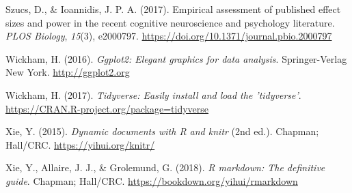 \documentclass[
  english,
  man,floatsintext]{apa6}
\newlength{\cslhangindent}
\newenvironment{cslreferences}%
  {\setlength{\parindent}{0pt}%
  \everypar{\setlength{\hangindent}{\cslhangindent}}\ignorespaces}%
  {\par}
\begin{document}
\begin{cslreferences}
\leavevmode\hypertarget{ref-szucs_empirical_2017}{}%
Szucs, D., \& Ioannidis, J. P. A. (2017). Empirical assessment of published effect sizes and power in the recent cognitive neuroscience and psychology literature. \emph{PLOS Biology}, \emph{15}(3), e2000797. \url{https://doi.org/10.1371/journal.pbio.2000797}

\leavevmode\hypertarget{ref-R-ggplot2}{}%
Wickham, H. (2016). \emph{Ggplot2: Elegant graphics for data analysis}. Springer-Verlag New York. \url{http://ggplot2.org}

\leavevmode\hypertarget{ref-R-tidyverse}{}%
Wickham, H. (2017). \emph{Tidyverse: Easily install and load the 'tidyverse'}. \url{https://CRAN.R-project.org/package=tidyverse}

\leavevmode\hypertarget{ref-R-knitr}{}%
Xie, Y. (2015). \emph{Dynamic documents with R and knitr} (2nd ed.). Chapman; Hall/CRC. \url{https://yihui.org/knitr/}

\leavevmode\hypertarget{ref-R-rmarkdown}{}%
Xie, Y., Allaire, J. J., \& Grolemund, G. (2018). \emph{R markdown: The definitive guide}. Chapman; Hall/CRC. \url{https://bookdown.org/yihui/rmarkdown}
\end{cslreferences}
\end{document}
